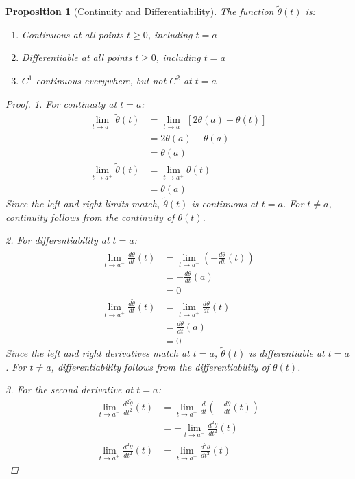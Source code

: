 \documentclass{article}
\newtheorem{proposition}[theorem]{Proposition}
\theoremstyle{definition}
\begin{document}
\begin{proposition}[Continuity and Differentiability]
The function $\tilde{\theta}(t)$ is:
\begin{enumerate}
    \item Continuous at all points $t \geq 0$, including $t = a$
    \item Differentiable at all points $t \geq 0$, including $t = a$
    \item $C^1$ continuous everywhere, but not $C^2$ at $t = a$
\end{enumerate}

\begin{proof}
1. For continuity at $t = a$:
\begin{align}
\lim_{t \to a^-} \tilde{\theta}(t) &= \lim_{t \to a^-} [2\theta(a) - \theta(t)] \\
&= 2\theta(a) - \theta(a) \\
&= \theta(a) \\
\lim_{t \to a^+} \tilde{\theta}(t) &= \lim_{t \to a^+} \theta(t) \\
&= \theta(a)
\end{align}
Since the left and right limits match, $\tilde{\theta}(t)$ is continuous at $t = a$. For $t \neq a$, continuity follows from the continuity of $\theta(t)$.

2. For differentiability at $t = a$:
\begin{align}
\lim_{t \to a^-} \frac{d\tilde{\theta}}{dt}(t) &= \lim_{t \to a^-} \left(-\frac{d\theta}{dt}(t)\right) \\
&= -\frac{d\theta}{dt}(a) \\
&= 0 \\
\lim_{t \to a^+} \frac{d\tilde{\theta}}{dt}(t) &= \lim_{t \to a^+} \frac{d\theta}{dt}(t) \\
&= \frac{d\theta}{dt}(a) \\
&= 0
\end{align}
Since the left and right derivatives match at $t = a$, $\tilde{\theta}(t)$ is differentiable at $t = a$. For $t \neq a$, differentiability follows from the differentiability of $\theta(t)$.

3. For the second derivative at $t = a$:
\begin{align}
\lim_{t \to a^-} \frac{d^2\tilde{\theta}}{dt^2}(t) &= \lim_{t \to a^-} \frac{d}{dt}\left(-\frac{d\theta}{dt}(t)\right) \\
&= -\lim_{t \to a^-} \frac{d^2\theta}{dt^2}(t) \\
\lim_{t \to a^+} \frac{d^2\tilde{\theta}}{dt^2}(t) &= \lim_{t \to a^+} \frac{d^2\theta}{dt^2}(t)
\end{align}


\end{proof}
\end{proposition}
\end{document}
